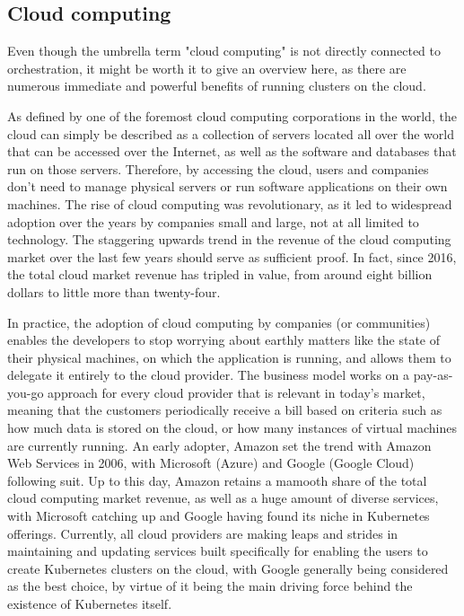 \documentclass[thesis=B,english]{FITthesis}[2019/12/23]
\begin{document}
\subsection{Cloud computing}

Even though the umbrella term "cloud computing" is not directly connected to orchestration, it might be worth it to give an overview here, as there are numerous immediate and powerful benefits of running clusters on the cloud.

As defined by one of the foremost cloud computing corporations in the world, the cloud can simply be described as a collection of servers located all over the world that can be accessed over the Internet, as well as the software and databases that run on those servers. Therefore, by accessing the cloud, users and companies don't need to manage physical servers or run software applications on their own machines. \cite{cloudflare} The rise of cloud computing was revolutionary, as it led to widespread adoption over the years by companies small and large, not at all limited to technology. The staggering upwards trend in the revenue of the cloud computing market over the last few years should serve as sufficient proof. In fact, since 2016, the total cloud market revenue has tripled in value, from around eight billion dollars to little more than twenty-four. \cite{cloud-market}

In practice, the adoption of cloud computing by companies (or communities) enables the developers to stop worrying about earthly matters like the state of their physical machines, on which the application is running, and allows them to delegate it entirely to the cloud provider. The business model works on a pay-as-you-go approach for every cloud provider that is relevant in today's market, meaning that the customers periodically receive a bill based on criteria such as how much data is stored on the cloud, or how many instances of virtual machines are currently running. \cite{aws-framework} An early adopter, Amazon set the trend with Amazon Web Services in 2006, with Microsoft (Azure) and Google (Google Cloud) following suit. Up to this day, Amazon retains a mamooth share of the total cloud computing market revenue, as well as a huge amount of diverse services, with Microsoft catching up and Google having found its niche in Kubernetes offerings. Currently, all cloud providers are making leaps and strides in maintaining and updating services built specifically for enabling the users to create Kubernetes clusters on the cloud, with Google generally being considered as the best choice, by virtue of it being the main driving force behind the existence of Kubernetes itself.
\end{document}
